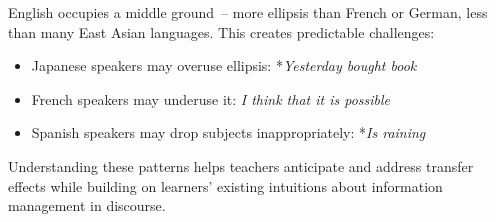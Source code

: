 English occupies a middle ground~-- more ellipsis than French or German, less than many East Asian languages. This creates predictable challenges:

\begin{itemize}[noitemsep]
\item Japanese speakers may overuse ellipsis: *\textit{Yesterday bought book}
\item French speakers may underuse it: \textit{I think that it is possible}
\item Spanish speakers may drop subjects inappropriately: *\textit{Is raining}
\end{itemize}

Understanding these patterns helps teachers anticipate and address transfer effects while building on learners' existing intuitions about information management in discourse.

